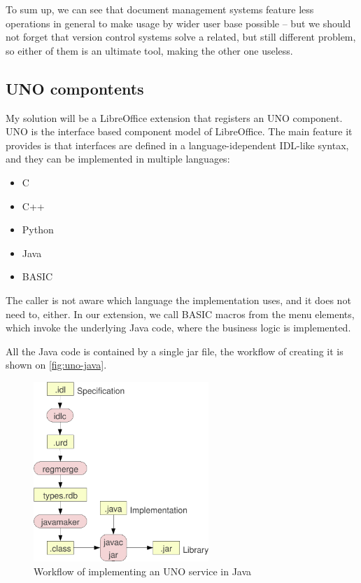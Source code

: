 To sum up, we can see that document management systems feature less operations
in general to make usage by wider user base possible -- but we should not
forget that version control systems solve a related, but still different
problem, so either of them is an ultimate tool, making the other one useless.

\subsection{UNO compontents}

My solution will be a LibreOffice extension that registers an UNO \cite{uno}
component. UNO is the interface based component model of LibreOffice. The main
feature it provides is that interfaces are defined in a language-idependent
IDL-like syntax, and they can be implemented in multiple languages:

\begin{itemize}
\item C
\item C++
\item Python
\item Java
\item BASIC
\end{itemize}

The caller is not aware which language the implementation uses, and it does not
need to, either. In our extension, we call BASIC macros from the menu elements,
which invoke the underlying Java code, where the business logic is implemented.

All the Java code is contained by a single jar file, the workflow of creating
it is shown on \autoref{fig:uno-java}.

\begin{figure}[H]
\centering
\includegraphics[width=250px,keepaspectratio]{uno-java.pdf}
\caption{Workflow of implementing an UNO service in Java}
\label{fig:uno-java}
\end{figure}

